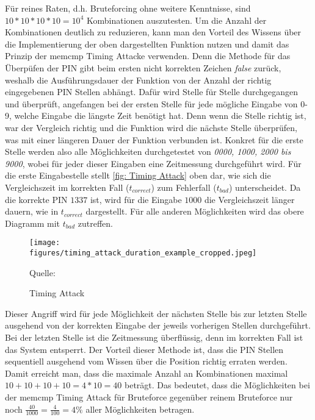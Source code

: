 \documentclass[a4paper,
DIV=13,
12pt,
BCOR=10mm,
department=FakIM,
oneside,
parskip=half,
automark,
listof=totocnumbered,
bibliography=totocnumbered,
acronym=totocnumbered
] {OTHRartcl}
\newcommand*{\quelle}[1]{\par\raggedleft\footnotesize Quelle:~#1}
\begin{document}
Für reines Raten, d.h. Bruteforcing ohne weitere Kenntnisse, sind $ 10*10*10*10 = 10^4 $ Kombinationen auszutesten.
Um die Anzahl der Kombinationen deutlich zu reduzieren, kann man den Vorteil des Wissens über die Implementierung der oben dargestellten Funktion nutzen und damit das Prinzip der memcmp Timing Attacke verwenden.
Denn die Methode für das Überpüfen der PIN gibt beim ersten nicht korrekten Zeichen \textit{false} zurück, weshalb die Ausführungsdauer der
Funktion von der Anzahl der richtig eingegebenen PIN Stellen abhängt.
Dafür wird Stelle für Stelle durchgegangen und überprüft, angefangen bei der ersten Stelle für jede mögliche Eingabe von 0-9, welche Eingabe die längste Zeit benötigt hat.
Denn wenn die Stelle richtig ist, war der Vergleich richtig und die Funktion wird die nächste Stelle überprüfen, was mit einer längeren Dauer der Funktion
verbunden ist.
Konkret für die erste Stelle werden also alle Möglichkeiten durchgetestet von \textit{0000, 1000, 2000 bis 9000}, wobei für jeder dieser Eingaben
eine Zeitmessung durchgeführt wird.
Für die erste Eingabestelle stellt \autoref{fig: Timing Attack} oben dar, wie sich die Vergleichszeit im
korrekten Fall ($t_{correct}$) zum Fehlerfall ($t_{bad}$) unterscheidet.
Da die korrekte PIN $1337$ ist, wird für die Eingabe $1000$ die Vergleichszeit länger dauern, wie in $t_{correct}$ dargestellt.
Für alle anderen Möglichkeiten wird das obere Diagramm mit $t_{bad}$ zutreffen.
\begin{figure}[ht!]
  \begin{center}
    \texttt{[image: figures/timing\_attack\_duration\_example\_cropped.jpeg]}
    \quelle{\cite{Hardware Hacking Handbook}}
    \caption{Timing Attack}
    \label{fig: Timing Attack}
  \end{center}
\end{figure}
Dieser Angriff wird für jede Möglichkeit der nächsten Stelle bis zur letzten Stelle ausgehend von der korrekten Eingabe der jeweils vorherigen Stellen durchgeführt.
Bei der letzten Stelle ist die Zeitmessung überflüssig, denn im korrekten Fall ist das System entsperrt.
Der Vorteil dieser Methode ist, dass die PIN Stellen sequentiell ausgehend vom Wissen über die Position richtig erraten werden.
Damit erreicht man, dass die maximale Anzahl an Kombinationen maximal $10+10+10+10 = 4*10 = 40 $ beträgt.
Das bedeutet, dass die Möglichkeiten bei der memcmp Timing Attack für Bruteforce gegenüber reinem Bruteforce nur noch $\frac{40}{1000} = \frac{4}{100} = 4\% $
aller Möglichkeiten betragen. \cite{Hardware Hacking Handbook}
\end{document}
